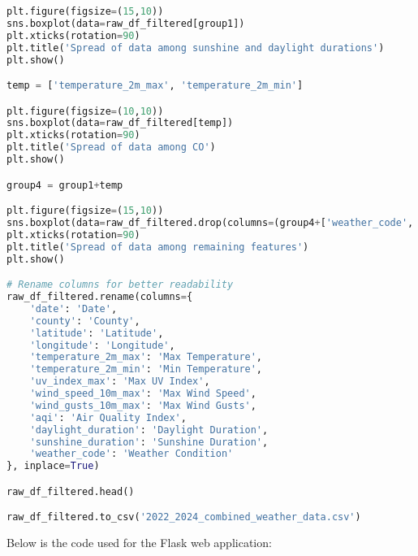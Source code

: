 \documentclass[a4paper, 12pt]{article}
\begin{document}
\begin{lstlisting}[language=Python, caption=Data Cleaning Code]
plt.figure(figsize=(15,10))
sns.boxplot(data=raw_df_filtered[group1])
plt.xticks(rotation=90)
plt.title('Spread of data among sunshine and daylight durations')
plt.show()

temp = ['temperature_2m_max', 'temperature_2m_min']

plt.figure(figsize=(10,10))
sns.boxplot(data=raw_df_filtered[temp])
plt.xticks(rotation=90)
plt.title('Spread of data among CO')
plt.show()

group4 = group1+temp

plt.figure(figsize=(15,10))
sns.boxplot(data=raw_df_filtered.drop(columns=(group4+['weather_code', 'latitude', 'longitude'])))
plt.xticks(rotation=90)
plt.title('Spread of data among remaining features')
plt.show()

# Rename columns for better readability
raw_df_filtered.rename(columns={
    'date': 'Date',
    'county': 'County',
    'latitude': 'Latitude',
    'longitude': 'Longitude',
    'temperature_2m_max': 'Max Temperature',
    'temperature_2m_min': 'Min Temperature',
    'uv_index_max': 'Max UV Index',
    'wind_speed_10m_max': 'Max Wind Speed',
    'wind_gusts_10m_max': 'Max Wind Gusts',
    'aqi': 'Air Quality Index',
    'daylight_duration': 'Daylight Duration',
    'sunshine_duration': 'Sunshine Duration',
    'weather_code': 'Weather Condition'
}, inplace=True)

raw_df_filtered.head()

raw_df_filtered.to_csv('2022_2024_combined_weather_data.csv')
\end{lstlisting}

Below is the code used for the Flask web application:
\end{document}
